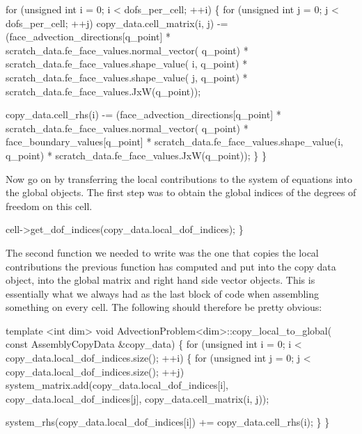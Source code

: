 \begin{DoxyCode}
            \textcolor{keywordflow}{for} (\textcolor{keywordtype}{unsigned} \textcolor{keywordtype}{int} i = 0; i < dofs\_per\_cell; ++i) \{
                \textcolor{keywordflow}{for} (\textcolor{keywordtype}{unsigned} \textcolor{keywordtype}{int} j = 0; j < dofs\_per\_cell; ++j)
                    copy\_data.cell\_matrix(i, j) -=
                        (face\_advection\_directions[q\_point] *
                         scratch\_data.fe\_face\_values.normal\_vector(
                             q\_point) *
                         scratch\_data.fe\_face\_values.shape\_value(
                             i, q\_point) *
                         scratch\_data.fe\_face\_values.shape\_value(
                             j, q\_point) *
                         scratch\_data.fe\_face\_values.JxW(q\_point));

                copy\_data.cell\_rhs(i) -=
                    (face\_advection\_directions[q\_point] *
                     scratch\_data.fe\_face\_values.normal\_vector(
                         q\_point) *
                     face\_boundary\_values[q\_point] *
                     scratch\_data.fe\_face\_values.shape\_value(i,
                                                             q\_point) *
                     scratch\_data.fe\_face\_values.JxW(q\_point));
            \}
\}
\end{DoxyCode}


Now go on by transferring the local contributions to the system of equations into the global objects. The first step was to obtain the global indices of the degrees of freedom on this cell.


\begin{DoxyCode}
    cell->get\_dof\_indices(copy\_data.local\_dof\_indices);
\}
\end{DoxyCode}


The second function we needed to write was the one that copies the local contributions the previous function has computed and put into the copy data object, into the global matrix and right hand side vector objects. This is essentially what we always had as the last block of code when assembling something on every cell. The following should therefore be pretty obvious\+:


\begin{DoxyCode}
\textcolor{keyword}{template} <\textcolor{keywordtype}{int} dim>
\textcolor{keywordtype}{void} AdvectionProblem<dim>::copy\_local\_to\_global(
    \textcolor{keyword}{const} AssemblyCopyData &copy\_data)
\{
    \textcolor{keywordflow}{for} (\textcolor{keywordtype}{unsigned} \textcolor{keywordtype}{int} i = 0; i < copy\_data.local\_dof\_indices.size(); ++i) \{
        \textcolor{keywordflow}{for} (\textcolor{keywordtype}{unsigned} \textcolor{keywordtype}{int} j = 0; j < copy\_data.local\_dof\_indices.size(); ++j)
            system\_matrix.add(copy\_data.local\_dof\_indices[i],
                              copy\_data.local\_dof\_indices[j],
                              copy\_data.cell\_matrix(i, j));

        system\_rhs(copy\_data.local\_dof\_indices[i]) += copy\_data.cell\_rhs(i);
    \}
\}
\end{DoxyCode}


